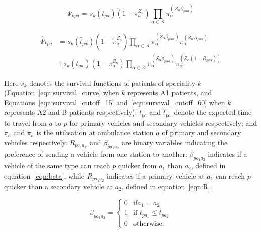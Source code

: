 \documentclass[preprint,12pt]{elsarticle}
\begin{document}
\begin{equation}\label{eqn:survival_A} \Psi_{kpa} = s_k\left( t_{pa} \right)
\left(1 - \pi_{a}^{Z_a} \right) \prod_{\alpha \in \mathcal{A}}
\pi_{\alpha}^{\left(Z_{\alpha} \beta_{p\alpha a} \right)} \end{equation}

\begin{align}\label{eqn:survival_B} \hat{\Psi}_{kpa} &=
    s_k\left(\hat{t}_{pa}\right) \left(1 - \tilde{\pi}_{a}^{\tilde{Z}_a} \right)
    \prod_{\alpha \in \mathcal{A}}
    \tilde{\pi}_{\alpha}^{\left(\tilde{Z}_{\alpha} \beta_{p\alpha a}\right)}
    \pi_{\alpha}^{\left(Z_{\alpha} R_{p \alpha a}\right) } \nonumber \\ &+
    s_k\left(t_{pa}\right) \left(1 - \pi_{a}^{Z_a} \right) \prod_{\alpha \in
    \mathcal{A}} \pi_{\alpha}^{\left(Z_{\alpha}\beta_{p\alpha a}\right)}
    \tilde{\pi}_{\alpha}^{\left(\tilde{Z}_{\alpha} \left(1 - R _{p
    a\alpha}\right)\right)} \end{align}


Here $s_k$ denotes the survival functions of patients of speciality $k$
(Equation~\ref{eqn:survival_curve} when $k$ represents A1 patients, and
Equations~\ref{eqn:survival_cutoff_15} and~\ref{eqn:survival_cutoff_60} when $k$
represents A2 and B patients respectively); $t_{pa}$ and $\hat{t}_{pa}$ denote
the expected time to travel from $a$ to $p$ for primary vehicles and secondary
vehicles respectively; and $\pi_{a}$ and $\tilde{\pi}_{a}$ is the utilisation at
ambulance station $a$ of primary and secondary vehicles respectively.  $R_{p a_1
a_2}$ and $\beta_{p a_1 a_2}$ are binary variables indicating the preference of
sending a vehicle from one station to another: $\beta_{p a_1 a_2}$ indicates if
a vehicle of the same type can reach $p$ quicker from $a_1$ than $a_2$, defined
in equation~\ref{eqn:beta}, while $R_{p a_1 a_2}$ indicates if a primary vehicle
at $a_1$ can reach $p$ quicker than a secondary vehicle at $a_2$, defined in
equation~\ref{eqn:R}.

\begin{equation}\label{eqn:beta} \beta_{p a_1 a_2} = \begin{cases} 0 & \text{if
} a_1 = a_2\\ 1 & \text{if } t_{p a_1} \leq t_{p a_2}\\ 0 & \text{otherwise.}
\end{cases} \end{equation}
\end{document}

